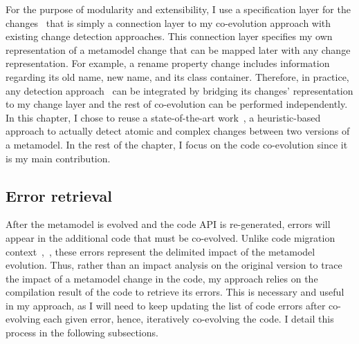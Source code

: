 For the purpose of modularity and extensibility, I use a specification layer for the changes~{\small{}} that is simply a connection layer to my co-evolution approach with existing change detection approaches. This connection layer specifies my own representation of a metamodel change that can be mapped later with any change representation.  
For example, a rename property change includes information regarding its old name, new name, and its class container. Therefore, in practice, any detection approach~\cite{Alter2015, williams2012searching,cicchetti_managing_2009,langer_posteriori_2013,vermolen_reconstructing_2012,Khelladi2016,bettini2022executable} can be integrated by bridging its changes' representation to my change layer and the rest of co-evolution can be performed independently.
In this chapter, I chose to reuse a state-of-the-art work~\cite{khelladi2016ad,Khelladi2016}, a heuristic-based approach to actually detect atomic and complex changes between two versions of a metamodel.
In the rest of the chapter, I focus on the code co-evolution since it is my main contribution. 

\subsection{Error retrieval}
\label{errorretrieving}

After the metamodel is evolved and the code API is re-generated, errors will appear in the additional code that must be co-evolved. Unlike code migration context~\cite{9079197},~\cite{henkel2005catchup}, these errors represent the delimited impact of the metamodel evolution. Thus, rather than an impact analysis on the original version to trace the impact of a metamodel change in the code, my approach relies on the compilation result of the code to retrieve its errors. 
This is necessary and useful in my approach, as I will need to keep updating the list of code errors after co-evolving each given error, hence, iteratively co-evolving the code. I detail this process in the following subsections.

